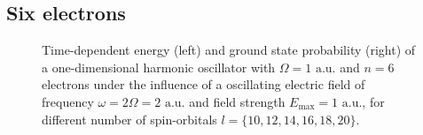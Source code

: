 \vfill
\pagebreak

\subsection*{Six electrons}

\begin{figure}[!h]
    \centering
    \caption{Time-dependent energy (left) and ground state probability (right)
        of a one-dimensional harmonic oscillator with $\Omega=1 \text{ a.u.}$
        and $n=6$ electrons under the influence of a oscillating electric field 
        of frequency $\omega = 2 \Omega = 2 \text{ a.u.}$ and field strength
        $E_\text{max}=1 \text{ a.u.}$,
        for different number of spin-orbitals $l=\{10,12,14,16,18,20\}$.
    }
    \label{fig:1d_n6_qd}
\end{figure}

